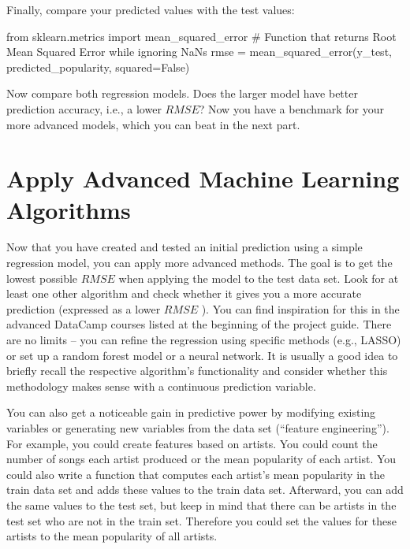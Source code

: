 \documentclass[
  11pt,
]{book}
\newenvironment{tipsp}[1]
  {
  \begin{itemize}
  \footnotesize
  \renewcommand{\labelitemi}{
    \raisebox{-.7\height}[0pt][0pt]{
      {\setkeys{Gin}{width=3em,keepaspectratio}
        \texttt{[image: images/\#1.png]}}
    }
  }
  \setlength{\fboxsep}{1em}
  \begin{pbox}
  \item
  }
  {
  \end{pbox}
  \end{itemize}
  }
\begin{document}
\begin{tipsp}p

Finally, compare your predicted values with the test values:

from sklearn.metrics import mean\_squared\_error
\# Function that returns Root Mean Squared Error while ignoring NaNs
rmse = mean\_squared\_error(y\_test, predicted\_popularity, squared=False)

\end{tipsp}

Now compare both regression models. Does the larger model have better prediction accuracy, i.e., a lower \(RMSE\)? Now you have a benchmark for your more advanced models, which you can beat in the next part.

\hypertarget{apply-advanced-machine-learning-algorithms}{%
\section{Apply Advanced Machine Learning Algorithms}\label{apply-advanced-machine-learning-algorithms}}

Now that you have created and tested an initial prediction using a simple regression model, you can apply more advanced methods. The goal is to get the lowest possible \(RMSE\) when applying the model to the test data set. Look for at least one other algorithm and check whether it gives you a more accurate prediction (expressed as a lower \(RMSE\) ). You can find inspiration for this in the advanced DataCamp courses listed at the beginning of the project guide. There are no limits -- you can refine the regression using specific methods (e.g., LASSO) or set up a random forest model or a neural network. It is usually a good idea to briefly recall the respective algorithm's functionality and consider whether this methodology makes sense with a continuous prediction variable.

You can also get a noticeable gain in predictive power by modifying existing variables or generating new variables from the data set (``feature engineering''). For example, you could create features based on artists. You could count the number of songs each artist produced or the mean popularity of each artist. You could also write a function that computes each artist's mean popularity in the train data set and adds these values to the train data set. Afterward, you can add the same values to the test set, but keep in mind that there can be artists in the test set who are not in the train set. Therefore you could set the values for these artists to the mean popularity of all artists.
\end{document}
